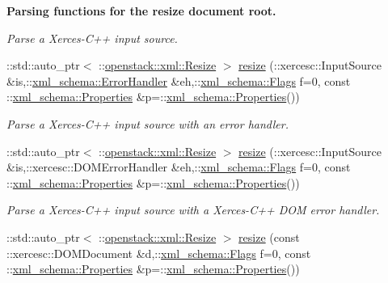 \begin{Indent}{\bf Parsing functions for the resize document root.}
\begin{DoxyCompactItemize}
\begin{DoxyCompactList}\small\item\em Parse a Xerces-\/C++ input source. \item\end{DoxyCompactList}\item 
::std::auto\_\-ptr$<$ ::\hyperlink{classopenstack_1_1xml_1_1Resize}{openstack::xml::Resize} $>$ \hyperlink{namespaceopenstack_1_1xml_a8ba12b03b2650f8b2d5b253905aab21b}{resize} (::xercesc::InputSource \&is,::\hyperlink{namespacexml__schema_ab1c9361bfd3b404eaabf0c31eded79dc}{xml\_\-schema::ErrorHandler} \&eh,::\hyperlink{namespacexml__schema_affb4c227cbd9aa7453dd1dc5a1401943}{xml\_\-schema::Flags} f=0, const ::\hyperlink{namespacexml__schema_ad27ce19a7ee1d3b1064092648898f64c}{xml\_\-schema::Properties} \&p=::\hyperlink{namespacexml__schema_ad27ce19a7ee1d3b1064092648898f64c}{xml\_\-schema::Properties}())
\begin{DoxyCompactList}\small\item\em Parse a Xerces-\/C++ input source with an error handler. \item\end{DoxyCompactList}\item 
::std::auto\_\-ptr$<$ ::\hyperlink{classopenstack_1_1xml_1_1Resize}{openstack::xml::Resize} $>$ \hyperlink{namespaceopenstack_1_1xml_a7af169631677991dfddc55d65dc09c41}{resize} (::xercesc::InputSource \&is,::xercesc::DOMErrorHandler \&eh,::\hyperlink{namespacexml__schema_affb4c227cbd9aa7453dd1dc5a1401943}{xml\_\-schema::Flags} f=0, const ::\hyperlink{namespacexml__schema_ad27ce19a7ee1d3b1064092648898f64c}{xml\_\-schema::Properties} \&p=::\hyperlink{namespacexml__schema_ad27ce19a7ee1d3b1064092648898f64c}{xml\_\-schema::Properties}())
\begin{DoxyCompactList}\small\item\em Parse a Xerces-\/C++ input source with a Xerces-\/C++ DOM error handler. \item\end{DoxyCompactList}\item 
::std::auto\_\-ptr$<$ ::\hyperlink{classopenstack_1_1xml_1_1Resize}{openstack::xml::Resize} $>$ \hyperlink{namespaceopenstack_1_1xml_afb43bb5b940ba76befece7f5d4fa648a}{resize} (const ::xercesc::DOMDocument \&d,::\hyperlink{namespacexml__schema_affb4c227cbd9aa7453dd1dc5a1401943}{xml\_\-schema::Flags} f=0, const ::\hyperlink{namespacexml__schema_ad27ce19a7ee1d3b1064092648898f64c}{xml\_\-schema::Properties} \&p=::\hyperlink{namespacexml__schema_ad27ce19a7ee1d3b1064092648898f64c}{xml\_\-schema::Properties}())

\end{DoxyCompactItemize}
\end{Indent}
